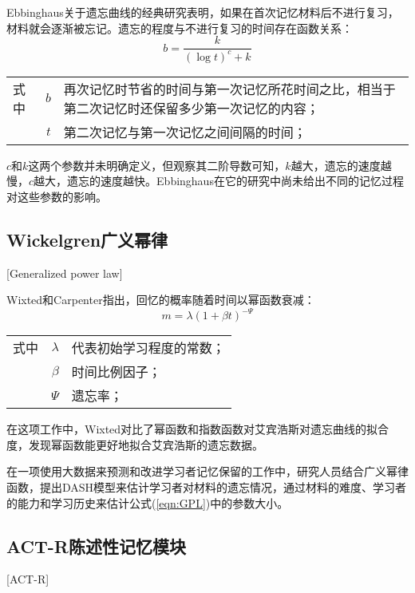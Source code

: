 Ebbinghaus关于遗忘曲线的经典研究表明\cite{ebbinghausMemoryContributionExperimental1913}，如果在首次记忆材料后不进行复习，材料就会逐渐被忘记。遗忘的程度与不进行复习的时间存在函数关系：
\begin{equation}
b = \frac{k}{(\log t)^c + k}
\end{equation}
\begin{tabularx}{\textwidth}{@{}l@{\quad}r@{———}X@{}}
    式中& $b$ &再次记忆时节省的时间与第一次记忆所花时间之比，相当于第二次记忆时还保留多少第一次记忆的内容；\\
    &  $t$ &第二次记忆与第一次记忆之间间隔的时间；
\end{tabularx}\vspace{3.15bp}

$c$和$k$这两个参数并未明确定义，但观察其二阶导数可知，$k$越大，遗忘的速度越慢，$c$越大，遗忘的速度越快。Ebbinghaus在它的研究中尚未给出不同的记忆过程对这些参数的影响。

\subsection{Wickelgren广义幂律}[Generalized power law]

Wixted和Carpenter\cite{wixtedWickelgrenPowerLaw2007}指出，回忆的概率随着时间以幂函数衰减：
\begin{equation}
\label{eqn:GPL}
m=\lambda(1+\beta t)^{-\varPsi}
\end{equation}
\begin{tabularx}{\textwidth}{@{}l@{\quad}r@{———}X@{}}
    式中& $\lambda$ &代表初始学习程度的常数；\\
    &  $\beta$ &时间比例因子；\\
    &  $\varPsi$ &遗忘率；
\end{tabularx}\vspace{3.15bp}

在这项工作中，Wixted对比了幂函数和指数函数对艾宾浩斯对遗忘曲线的拟合度，发现幂函数能更好地拟合艾宾浩斯的遗忘数据。

在一项使用大数据来预测和改进学习者记忆保留的工作中，研究人员结合广义幂律函数，提出DASH模型来估计学习者对材料的遗忘情况，通过材料的难度、学习者的能力和学习历史来估计公式(\ref{eqn:GPL})中的参数大小\cite{jonesPredictingImprovingMemory2016}。

\subsection{ACT-R陈述性记忆模块}[ACT-R]

